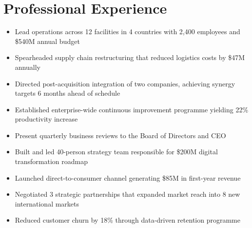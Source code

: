 
\section{Professional Experience}




\begin{itemize}

  \item Lead operations across 12 facilities in 4 countries with 2,400 employees and \$540M annual budget

  \item Spearheaded supply chain restructuring that reduced logistics costs by \$47M annually

  \item Directed post-acquisition integration of two companies, achieving synergy targets 6 months ahead of schedule

  \item Established enterprise-wide continuous improvement programme yielding 22\% productivity increase

  \item Present quarterly business reviews to the Board of Directors and CEO

\end{itemize}





\begin{itemize}

  \item Built and led 40-person strategy team responsible for \$200M digital transformation roadmap

  \item Launched direct-to-consumer channel generating \$85M in first-year revenue

  \item Negotiated 3 strategic partnerships that expanded market reach into 8 new international markets

  \item Reduced customer churn by 18\% through data-driven retention programme

\end{itemize}






